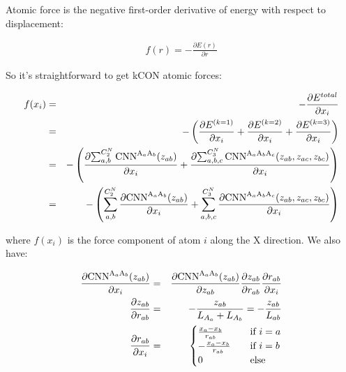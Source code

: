 \documentclass{article}
\begin{document}
Atomic force is the negative first-order derivative of energy with respect to 
displacement:

\begin{eqnarray}
f(r) = -\frac{\partial E(r)}{\partial r}
\end{eqnarray}

\noindent So it's straightforward to get kCON atomic forces:

\begin{eqnarray}
f(x_{i}) & = & -\frac{\partial{E^{total}}}{\partial{x_{i}}} \nonumber \\
& = & -\left(
	\frac{\partial{E^{(k=1)}}}{\partial{x_i}} 
	+ \frac{\partial{E^{(k=2)}}}{\partial{x_i}}
	+ \frac{\partial{E^{(k=3)}}}{\partial{x_i}} 
\right) \nonumber \\
& = & -\left(
\frac{
	\partial{\sum_{a,b}^{C^N_2}{
		\boldmath{\mathrm{CNN}}^{\mathrm{A}_{a}\mathrm{A}_{b}}}(z_{ab})}
	}{
		\partial{x_i}
	} 
+ 
\frac{
	\partial{\sum_{a,b,c}^{C^N_3}{
		\boldmath{\mathrm{CNN}}^{\mathrm{A}_{a}\mathrm{A}_{b}\mathrm{A}_{c}}}
		(z_{ab}, z_{ac}, z_{bc})}
	}{
		\partial{x_i}
	} 
\right) \nonumber \\
& = & -\left(
\sum_{a,b}^{C^N_2}{
	\frac{
		\partial{\boldmath{\mathrm{CNN}}^{\mathrm{A}_{a}\mathrm{A}_{b}}(z_{ab})}
	}{
		\partial{x_i}
	}
}
	+
\sum_{a,b,c}^{C^N_3}{
	\frac{
		\partial{\boldmath{\mathrm{CNN}}^{\mathrm{A}_{a}\mathrm{A}_{b}\mathrm{A}_{c}}
		(z_{ab}, z_{ac}, z_{bc})}
	}{
		\partial{x_i}
	}
}
\right)
\end{eqnarray}

\noindent where $f(x_{i})$ is the force component of atom $i$ along the X direction. We 
also have:

\begin{eqnarray}
%
%
\frac{
	\partial{\boldmath{\mathrm{CNN}}^{\mathrm{A}_{a}\mathrm{A}_{b}}(z_{ab})}
}{
	\partial{x_i}
} 
& = & 
\frac{\partial{
	\boldmath{\mathrm{CNN}}^{\mathrm{A}_{a}\mathrm{A}_{b}}(z_{ab})}
}{
	\partial{z_{ab}}
} \frac{\partial{z_{ab}}}{\partial{r_{ab}}} \frac{\partial{r_{ab}}}{\partial{x_i}} \\
%
%
\frac{ \partial{z_{ab}}}{\partial{r_{ab}}} 
& = & 
-\frac{z_{ab}}{L_{A_a} + L_{A_b}} = -\frac{z_{ab}}{L_{ab}} \\
%
%
\frac{\partial{r_{ab}}}{\partial{x_i}} & = & \begin{cases}
	\frac{x_a - x_b}{r_{ab}} & \quad \text{if } i = a \\
	-\frac{x_a - x_b}{r_{ab}} & \quad \text{if } i = b \\
	0                        & \quad \text{else}
\end{cases} 
\end{eqnarray}
\end{document}
